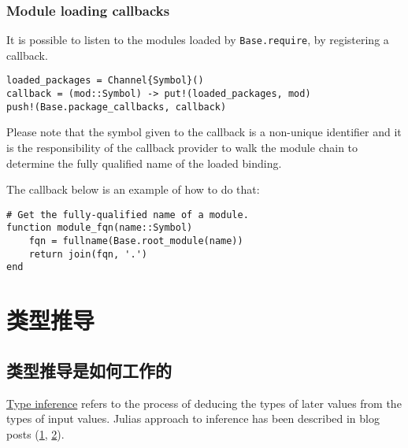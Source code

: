 \hypertarget{14149276766401458683}{}


\subsubsection{Module loading callbacks}



It is possible to listen to the modules loaded by \texttt{Base.require}, by registering a callback.




\begin{verbatim}
loaded_packages = Channel{Symbol}()
callback = (mod::Symbol) -> put!(loaded_packages, mod)
push!(Base.package_callbacks, callback)
\end{verbatim}



Please note that the symbol given to the callback is a non-unique identifier and it is the responsibility of the callback provider to walk the module chain to determine the fully qualified name of the loaded binding.



The callback below is an example of how to do that:




\begin{verbatim}
# Get the fully-qualified name of a module.
function module_fqn(name::Symbol)
    fqn = fullname(Base.root_module(name))
    return join(fqn, '.')
end
\end{verbatim}



\hypertarget{17787937227289045576}{}


\section{类型推导}



\hypertarget{2654942546276234129}{}


\subsection{类型推导是如何工作的}



\href{https://en.wikipedia.org/wiki/Type\_inference}{Type inference} refers to the process of deducing the types of later values from the types of input values. Julia{\textquotesingle}s approach to inference has been described in blog posts (\href{https://juliacomputing.com/blog/2016/04/inference-convergence/}{1}, \href{https://juliacomputing.com/blog/2017/05/inference-converage2/}{2}).



